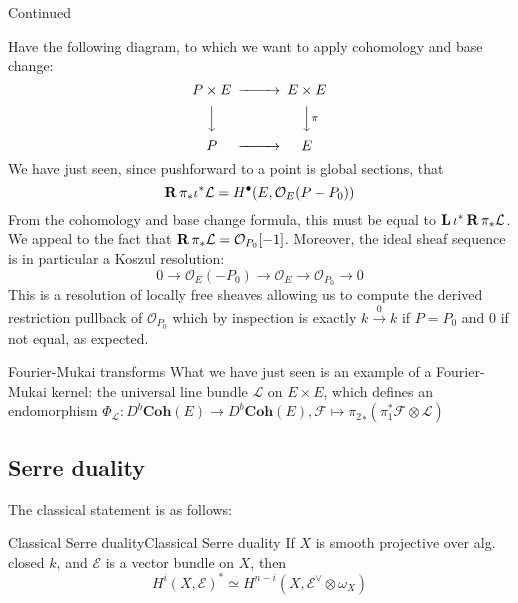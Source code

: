 \begin{example}{Continued}{}

Have the following diagram, to which we want to apply cohomology and base change: $$\begin{CD}
P\times E @> > > E\times E\\ @VVV @VV\pi V \\ P @> > > E
\end{CD}$$
We have just seen, since pushforward to a point is global sections, that$$\operatorname{\mathbf{R}} \pi_{*}\iota^*\mathcal{L}=H^\bullet(E, \mathcal{O}_{E}(P-P_{0}))$$From the cohomology and base change formula, this must be equal to $\operatorname{\mathbf{L}} \iota^*\operatorname{\mathbf{R}} \pi_{*}\mathcal{L}$. We appeal to the fact that $\operatorname{\mathbf{R}} \pi_{*}\mathcal{L}=\mathcal{O}_{P_{0}}[-1]$. Moreover, the ideal sheaf sequence is in particular a Koszul resolution: $$0\rightarrow \mathcal{O}_{E}(-P_{0})\xrightarrow{}\mathcal{O}_{E}\xrightarrow{}\mathcal{O}_{{P_{0}}}\xrightarrow{}0$$This is a resolution of locally free sheaves allowing us to compute the derived restriction pullback of $\mathcal{O}_{{P}_{0}}$ which by inspection is exactly $k\xrightarrow{0}k$ if $P=P_0$ and $0$ if not equal, as expected. 


\end{example}

\begin{remark}{Fourier-Mukai transforms}{}
    What we have just seen is an example of a Fourier-Mukai kernel: the universal line bundle $\mathcal{L}$ on $E\times E$, which defines an endomorphism $\Phi_\mathcal{L}:D^b \mathbf{Coh}(E)\rightarrow D^b \mathbf{Coh}(E), \mathcal{F}\mapsto {\pi_2}_*(\pi_1^* \mathcal{F} \otimes \mathcal{L})$
    
\end{remark}

\subsection{Serre duality}

The classical statement is as follows:

\begin{proposition}{Classical Serre duality}{Classical Serre duality}
    If $X$ is smooth projective over alg. closed $k$, and $\mathcal{E}$ is a vector bundle on $X$, then $$H^i(X,\mathcal{E})^*\simeq H^{n-i}(X, \mathcal{E}^\lor\otimes \omega_{X})$$
\end{proposition}


